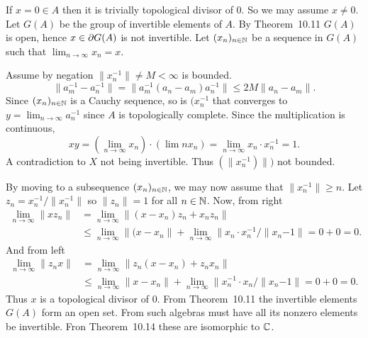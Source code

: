 \begin{enumerate}
\begin{itemize}
  \newcommand{\limn}{\lim_{n\to\infty}}
  If \(x=0\in A\) then it is trivially topological divisor of $0$.
  So we may assume \(x\neq 0\).
  Let \(G(A)\) be the group of invertible elements of $A$.
  By Theorem~10.11 \(G(A)\) is open, hence \(x\in \partial G(A)\)
  is not invertible.
  Let \((x_n)_{n\in\mathbb{N}}\) be a sequence in \(G(A)\)
  such that \(\limn x_n = x\).

  Assume by negation \(\|x_n^{-1}\|\neq M < \infty\) is bounded.
  \begin{equation*}
  \|a_m^{-1} - a_n^{-1}\|
  = \|a_m^{-1}(a_n - a_m)a_n^{-1}\|
  \leq 2M\|a_n - a_m\|.
  \end{equation*}
  Since \((x_n)_{n\in\mathbb{N}}\) is a Cauchy sequence, so is \((x_n^{-1}\)
  that converges to \(y = \limn a_n^{-1}\) since $A$ is
  topologically complete. Since the multiplication is continuous,
  \begin{equation*}
  xy = \left(\limn x_n\right)\cdot\left(\lim nx_n\right)
  = \limn x_n\cdot x_n^{-1} = 1.
  \end{equation*}
  A contradiction to $X$ not being invertible.
  Thus  \((\|x_n^{-1})\|)\) not bounded.

  By moving to a subsequence  \((x_n)_{n\in\mathbb{N}}\),
  we may now assume that \(\|x_n^{-1}\| \geq n\).
  Let \(z_n = x_n^{-1}/\|x_n^{-1}\|\) so \(\|z_n\|=1\) for all \(n\in\mathbb{N}\).
  Now, from right
  \begin{align*}
  \limn \|xz_n\|
    &= \limn \|(x - x_n)z_n + x_n z_n\| \\
    &\leq \limn \|(x - x_n\| + \limn \|x_n \cdot x_n^{-1}/\|x_n{-1}\|
    = 0 + 0 = 0.
  \end{align*}
  And from left
  \begin{align*}
  \limn \|z_n x\|
    &= \limn \|z_n(x - x_n) + z_n x_n\| \\
    &\leq \limn \|x - x_n\| + \limn \|x_n^{-1} \cdot x_n/\|x_n{-1}\|
    = 0 + 0 = 0.
  \end{align*}
  Thus $x$ is a topological divisor of $0$.
  From Theorem~10.11 the invertible elements \(G(A)\) form an open set.
  From  such algebras must have all its nonzero elements be invertible.
  Fron Theorem~10.14 these are isomorphic to \(\mathbb{C}\).
\end{itemize}


\end{enumerate}
